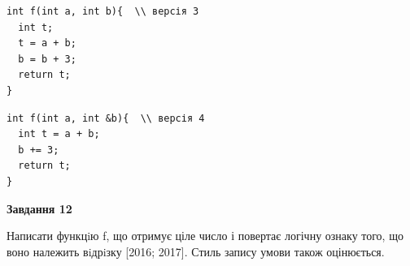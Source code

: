 \documentclass[12pt, ukrainian]{article}
\begin{document}
{\begin {large}
\begin{minipage}[t]{11.0cm}
\vspace{-8mm}\begin{verbatim}
int f(int a, int b){  \\ версія 3
  int t;
  t = a + b;
  b = b + 3;
  return t;
}
\end{verbatim}

\vspace{-8mm}\begin{verbatim}
int f(int a, int &b){  \\ версія 4
  int t = a + b;
  b += 3;
  return t;
}
\end{verbatim}



\begin{center}
\textbf{Завдання 12}
\end{center}

Написати функцiю f, що отримує ціле число і повертає логічну ознаку того, що воно належить вiдрiзку [2016; 2017]. Стиль запису умови також оцінюється.\par

\end{minipage}

\end {large}}
\newpage
\end{document}
